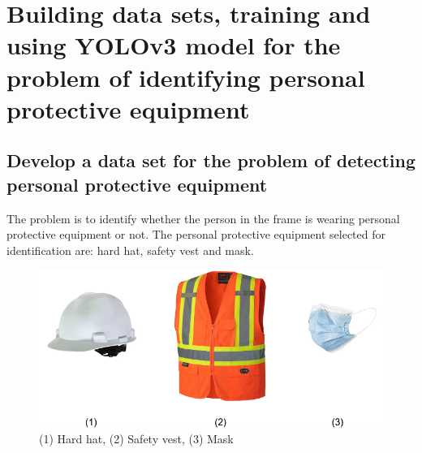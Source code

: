 \documentclass[conference]{IEEEtran}
\begin{document}
\section{Building data sets, training and using YOLOv3 model for the problem of identifying personal protective equipment}
\subsection{Develop a data set for the problem of detecting personal protective equipment}
The problem is to identify whether the person in the frame is wearing personal protective equipment or not. The personal protective equipment selected for identification are: hard hat, safety vest and mask.
\begin{figure}[ht]
	\centerline{\includegraphics[scale=0.3]{images/ppe.png}}
  	\caption{(1) Hard hat, (2) Safety vest, (3) Mask}
  	\label{fig:ppe}
\end{figure}
\end{document}
